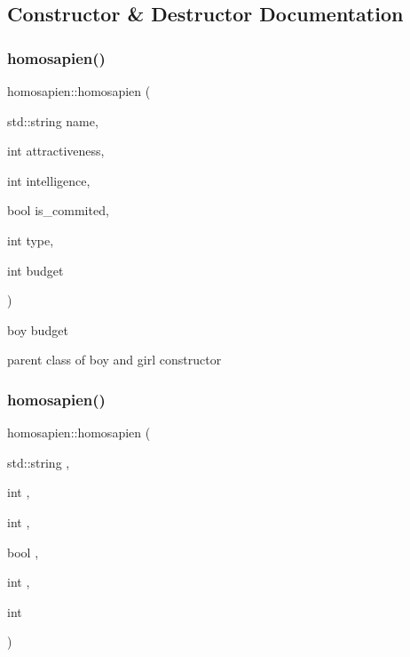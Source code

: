 \subsection{Constructor \& Destructor Documentation}
\mbox{\label{classhomosapien_a102098b80f8af39b27dafdff15d6aeee}} 
\subsubsection{\texorpdfstring{homosapien()}{homosapien()}\hspace{0.1cm}{\footnotesize\ttfamily [1/2]}}
{\footnotesize\ttfamily homosapien\+::homosapien (\begin{DoxyParamCaption}\item[{std\+::string}]{name,  }\item[{int}]{attractiveness,  }\item[{int}]{intelligence,  }\item[{bool}]{is\+\_\+commited,  }\item[{int}]{type,  }\item[{int}]{budget }\end{DoxyParamCaption})}



boy budget 

parent class of boy and girl constructor \mbox{\label{classhomosapien_a102098b80f8af39b27dafdff15d6aeee}} 
\subsubsection{\texorpdfstring{homosapien()}{homosapien()}\hspace{0.1cm}{\footnotesize\ttfamily [2/2]}}
{\footnotesize\ttfamily homosapien\+::homosapien (\begin{DoxyParamCaption}\item[{std\+::string}]{,  }\item[{int}]{,  }\item[{int}]{,  }\item[{bool}]{,  }\item[{int}]{,  }\item[{int}]{ }\end{DoxyParamCaption})}



